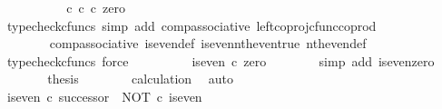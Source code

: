 \begin{isabellebody}
\ \ \ \ \isamarkupfalse%
\ \isamarkupfalse%
\ {\isachardoublequoteopen}{\isachardot}{\kern0pt}{\isachardot}{\kern0pt}{\isachardot}{\kern0pt}\ {\isacharequal}{\kern0pt}\ {\isacharparenleft}{\kern0pt}{\isasymt}\ {\isasymcirc}\isactrlsub c\ {\isasymbeta}\isactrlbsub {\isasymnat}\isactrlsub c\isactrlesub {\isacharparenright}{\kern0pt}\ {\isasymcirc}\isactrlsub c\ zero{\isachardoublequoteclose}\isanewline
\ \ \ \ \ \ \isamarkupfalse%
\ {\isacharparenleft}{\kern0pt}typecheck{\isacharunderscore}{\kern0pt}cfuncs{\isacharcomma}{\kern0pt}\ simp\ add{\isacharcolon}{\kern0pt}\ comp{\isacharunderscore}{\kern0pt}associative{}\ left{\isacharunderscore}{\kern0pt}coproj{\isacharunderscore}{\kern0pt}cfunc{\isacharunderscore}{\kern0pt}coprod{\isacharparenright}{\kern0pt}\isanewline
\ \ \ \ \isamarkupfalse%
\ \isamarkupfalse%
\ {\isachardoublequoteopen}{\isachardot}{\kern0pt}{\isachardot}{\kern0pt}{\isachardot}{\kern0pt}\ {\isacharequal}{\kern0pt}\ {\isasymt}{\isachardoublequoteclose}\isanewline
\ \ \ \ \ \ \isamarkupfalse%
\ comp{\isacharunderscore}{\kern0pt}associative{}\ is{\isacharunderscore}{\kern0pt}even{\isacharunderscore}{\kern0pt}def{}\ is{\isacharunderscore}{\kern0pt}even{\isacharunderscore}{\kern0pt}nth{\isacharunderscore}{\kern0pt}even{\isacharunderscore}{\kern0pt}true\ nth{\isacharunderscore}{\kern0pt}even{\isacharunderscore}{\kern0pt}def{}\ \isamarkupfalse%
\ {\isacharparenleft}{\kern0pt}typecheck{\isacharunderscore}{\kern0pt}cfuncs{\isacharcomma}{\kern0pt}\ force{\isacharparenright}{\kern0pt}\isanewline
\ \ \ \ \isamarkupfalse%
\ \isamarkupfalse%
\ {\isachardoublequoteopen}{\isachardot}{\kern0pt}{\isachardot}{\kern0pt}{\isachardot}{\kern0pt}\ {\isacharequal}{\kern0pt}\ is{\isacharunderscore}{\kern0pt}even\ {\isasymcirc}\isactrlsub c\ zero{\isachardoublequoteclose}\isanewline
\ \ \ \ \ \ \isamarkupfalse%
\ {\isacharparenleft}{\kern0pt}simp\ add{\isacharcolon}{\kern0pt}\ is{\isacharunderscore}{\kern0pt}even{\isacharunderscore}{\kern0pt}zero{\isacharparenright}{\kern0pt}\isanewline
\ \ \ \ \isamarkupfalse%
\ \isamarkupfalse%
\ {\isacharquery}{\kern0pt}thesis\isanewline
\ \ \ \ \ \ \isamarkupfalse%
\ calculation\ \isamarkupfalse%
\ auto\isanewline
\ \ \isamarkupfalse%
\isanewline
\isanewline
\ \ \isamarkupfalse%
\ {\isachardoublequoteopen}is{\isacharunderscore}{\kern0pt}even\ {\isasymcirc}\isactrlsub c\ successor\ {\isacharequal}{\kern0pt}\ NOT\ {\isasymcirc}\isactrlsub c\ is{\isacharunderscore}{\kern0pt}even{\isachardoublequoteclose}\isanewline

\end{isabellebody}
